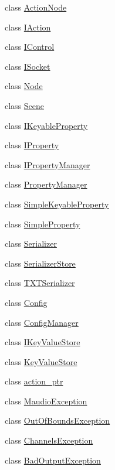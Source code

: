 \begin{DoxyCompactItemize}
class \hyperlink{classmaudio_1_1ActionNode}{Action\-Node}
\item 
class \hyperlink{classmaudio_1_1IAction}{I\-Action}
\item 
class \hyperlink{classmaudio_1_1IControl}{I\-Control}
\item 
class \hyperlink{classmaudio_1_1ISocket}{I\-Socket}
\item 
class \hyperlink{classmaudio_1_1Node}{Node}
\item 
class \hyperlink{classmaudio_1_1Scene}{Scene}
\item 
class \hyperlink{classmaudio_1_1IKeyableProperty}{I\-Keyable\-Property}
\item 
class \hyperlink{classmaudio_1_1IProperty}{I\-Property}
\item 
class \hyperlink{classmaudio_1_1IPropertyManager}{I\-Property\-Manager}
\item 
class \hyperlink{classmaudio_1_1PropertyManager}{Property\-Manager}
\item 
class \hyperlink{classmaudio_1_1SimpleKeyableProperty}{Simple\-Keyable\-Property}
\item 
class \hyperlink{classmaudio_1_1SimpleProperty}{Simple\-Property}
\item 
class \hyperlink{classmaudio_1_1Serializer}{Serializer}
\item 
class \hyperlink{classmaudio_1_1SerializerStore}{Serializer\-Store}
\item 
class \hyperlink{classmaudio_1_1TXTSerializer}{T\-X\-T\-Serializer}
\item 
class \hyperlink{classmaudio_1_1Config}{Config}
\item 
class \hyperlink{classmaudio_1_1ConfigManager}{Config\-Manager}
\item 
class \hyperlink{classmaudio_1_1IKeyValueStore}{I\-Key\-Value\-Store}
\item 
class \hyperlink{classmaudio_1_1KeyValueStore}{Key\-Value\-Store}
\item 
class \hyperlink{classmaudio_1_1action__ptr}{action\-\_\-ptr}
\item 
class \hyperlink{classmaudio_1_1MaudioException}{Maudio\-Exception}
\item 
class \hyperlink{classmaudio_1_1OutOfBoundsException}{Out\-Of\-Bounds\-Exception}
\item 
class \hyperlink{classmaudio_1_1ChannelsException}{Channels\-Exception}
\item 
class \hyperlink{classmaudio_1_1BadOutputException}{Bad\-Output\-Exception}

\end{DoxyCompactItemize}
